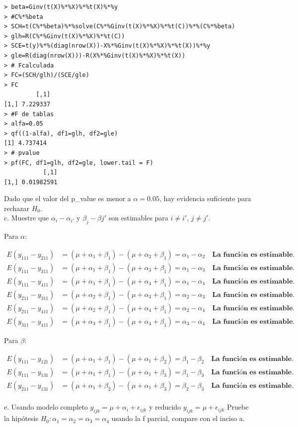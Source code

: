 \documentclass[12pt,a4paper]{report}
\begin{document}
\begin{verbatim}
> beta=Ginv(t(X)%*%X)%*%t(X)%*%y
> #C%*%beta
> SCH=t(C%*%beta)%*%solve(C%*%Ginv(t(X)%*%X)%*%t(C))%*%(C%*%beta)
> glh=R(C%*%Ginv(t(X)%*%X)%*%t(C))
> SCE=t(y)%*%(diag(nrow(X))-X%*%Ginv(t(X)%*%X)%*%t(X))%*%y
> gle=R(diag(nrow(X)))-R(X%*%Ginv(t(X)%*%X)%*%t(X))
> # Fcalculada
> FC=(SCH/glh)/(SCE/gle)
> FC 
         [,1]
[1,] 7.229337
> #F de tablas
> alfa=0.05
> qf((1-alfa), df1=glh, df2=gle)
[1] 4.737414
> # pvalue
> pf(FC, df1=glh, df2=gle, lower.tail = F)
           [,1]
[1,] 0.01982591
\end{verbatim}

Dado que el valor del p\_value es menor a $\alpha =0.05$, 
hay evidencia suficiente para rechazar $H_{0}$. \\



c. Muestre que $\alpha_i - \alpha_{i'}$ y $\beta_j-\beta{j'}$ son estimables para $i \neq i'$, $j\neq j'$.

Para $\alpha:$


\begin{align*}
E(y_{111}-y_{211})&= (\mu+\alpha_1+\beta_1)-(\mu+\alpha_2+\beta_1)=\alpha_1-\alpha_2 \quad\textbf{La función es estimable.} \\
E(y_{111}-y_{311})&= (\mu+\alpha_1+\beta_1)-(\mu+\alpha_3+\beta_1)=\alpha_1-\alpha_3 \quad\textbf{La función es estimable.} \\
E(y_{111}-y_{411})&= (\mu+\alpha_1+\beta_1)-(\mu+\alpha_4+\beta_1)=\alpha_1-\alpha_4 \quad\textbf{La función es estimable.} \\
E(y_{211}-y_{311})&= (\mu+\alpha_2+\beta_1)-(\mu+\alpha_3+\beta_1)=\alpha_2-\alpha_3 \quad\textbf{La función es estimable.} \\
E(y_{211}-y_{411})&= (\mu+\alpha_2+\beta_1)-(\mu+\alpha_4+\beta_1)=\alpha_2-\alpha_4 \quad\textbf{La función es estimable.} \\
E(y_{311}-y_{411})&= (\mu+\alpha_3+\beta_1)-(\mu+\alpha_4+\beta_1)=\alpha_3-\alpha_4 \quad\textbf{La función es estimable.}
\end{align*}

Para $\beta:$


\begin{align*}
E(y_{111}-y_{121})&= (\mu+\alpha_1+\beta_1)-(\mu+\alpha_1+\beta_2)=\beta_1-\beta_2 \quad\textbf{La función es estimable.} \\
E(y_{111}-y_{131})&= (\mu+\alpha_1+\beta_1)-(\mu+\alpha_1+\beta_3)=\beta_1-\beta_3 \quad\textbf{La función es estimable.}\\
E(y_{211}-y_{131})&= (\mu+\alpha_1+\beta_2)-(\mu+\alpha_1+\beta_3)=\beta_2-\beta_3 \quad\textbf{La función es estimable.}
\end{align*}
\\
 e. Usando modelo completo $y_{ijk} = \mu + \alpha_i + \epsilon_{ijk}$ y reducido $y_{ijk} = \mu + \epsilon_{ijk}$ Pruebe la hipótesis $H_0 : \alpha_1 = \alpha_2 = \alpha_3 = \alpha_4$ usando la f parcial, compare con el inciso a.\\
 
\end{document}
